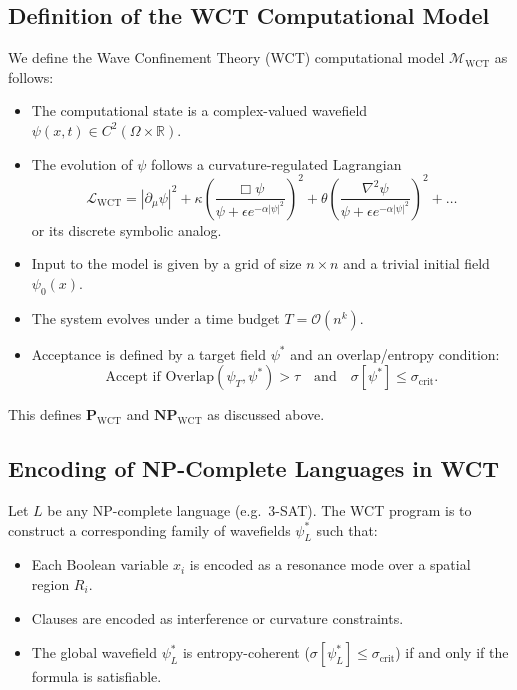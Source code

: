 \documentclass[12pt]{article}
\theoremstyle{remark}
\begin{document}
\subsection{Definition of the WCT Computational Model}

We define the Wave Confinement Theory (WCT) computational model \( \mathcal{M}_{\mathrm{WCT}} \) as follows:

\begin{itemize}
  \item The computational state is a complex-valued wavefield \( \psi(x, t) \in C^2(\Omega \times \mathbb{R}) \).
  \item The evolution of \( \psi \) follows a curvature-regulated Lagrangian
  \begin{equation}
  \mathcal{L}_{\mathrm{WCT}} = |\partial_\mu \psi|^2
  + \kappa \left(\frac{\Box \psi}{\psi + \epsilon e^{-\alpha |\psi|^2}}\right)^2
  + \theta \left(\frac{\nabla^2 \psi}{\psi + \epsilon e^{-\alpha |\psi|^2}}\right)^2 + \dots
  \end{equation}
  or its discrete symbolic analog.
  \item Input to the model is given by a grid of size \( n \times n \) and a trivial initial field \( \psi_0(x) \).
  \item The system evolves under a time budget \( T = \mathcal{O}(n^k) \).
  \item Acceptance is defined by a target field \( \psi^* \) and an overlap/entropy condition:
  \begin{equation}
  \text{Accept if } \mathrm{Overlap}(\psi_T, \psi^*) > \tau \quad \text{and} \quad \sigma[\psi^*] \leq \sigma_{\text{crit}}.
  \end{equation}
\end{itemize}

This defines \(\mathbf{P}_{\mathrm{WCT}}\) and \(\mathbf{NP}_{\mathrm{WCT}}\) as discussed above.

\subsection{Encoding of NP-Complete Languages in WCT}

Let \( L \) be any NP-complete language (e.g.\ 3-SAT). The WCT program is to construct a corresponding family of wavefields \( \psi^*_L \) such that:

\begin{itemize}
  \item Each Boolean variable \( x_i \) is encoded as a resonance mode over a spatial region \( R_i \).
  \item Clauses are encoded as interference or curvature constraints.
  \item The global wavefield \( \psi^*_L \) is entropy-coherent (\( \sigma[\psi^*_L] \leq \sigma_{\text{crit}} \)) if and only if the formula is satisfiable.
\end{itemize}
\end{document}
